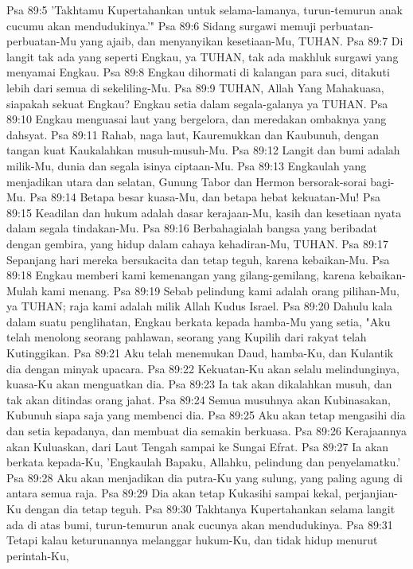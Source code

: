 Psa 89:5  'Takhtamu Kupertahankan untuk selama-lamanya, turun-temurun anak cucumu akan mendudukinya.'"
Psa 89:6  Sidang surgawi memuji perbuatan-perbuatan-Mu yang ajaib, dan menyanyikan kesetiaan-Mu, TUHAN.
Psa 89:7  Di langit tak ada yang seperti Engkau, ya TUHAN, tak ada makhluk surgawi yang menyamai Engkau.
Psa 89:8  Engkau dihormati di kalangan para suci, ditakuti lebih dari semua di sekeliling-Mu.
Psa 89:9  TUHAN, Allah Yang Mahakuasa, siapakah sekuat Engkau? Engkau setia dalam segala-galanya ya TUHAN.
Psa 89:10  Engkau menguasai laut yang bergelora, dan meredakan ombaknya yang dahsyat.
Psa 89:11  Rahab, naga laut, Kauremukkan dan Kaubunuh, dengan tangan kuat Kaukalahkan musuh-musuh-Mu.
Psa 89:12  Langit dan bumi adalah milik-Mu, dunia dan segala isinya ciptaan-Mu.
Psa 89:13  Engkaulah yang menjadikan utara dan selatan, Gunung Tabor dan Hermon bersorak-sorai bagi-Mu.
Psa 89:14  Betapa besar kuasa-Mu, dan betapa hebat kekuatan-Mu!
Psa 89:15  Keadilan dan hukum adalah dasar kerajaan-Mu, kasih dan kesetiaan nyata dalam segala tindakan-Mu.
Psa 89:16  Berbahagialah bangsa yang beribadat dengan gembira, yang hidup dalam cahaya kehadiran-Mu, TUHAN.
Psa 89:17  Sepanjang hari mereka bersukacita dan tetap teguh, karena kebaikan-Mu.
Psa 89:18  Engkau memberi kami kemenangan yang gilang-gemilang, karena kebaikan-Mulah kami menang.
Psa 89:19  Sebab pelindung kami adalah orang pilihan-Mu, ya TUHAN; raja kami adalah milik Allah Kudus Israel.
Psa 89:20  Dahulu kala dalam suatu penglihatan, Engkau berkata kepada hamba-Mu yang setia, "Aku telah menolong seorang pahlawan, seorang yang Kupilih dari rakyat telah Kutinggikan.
Psa 89:21  Aku telah menemukan Daud, hamba-Ku, dan Kulantik dia dengan minyak upacara.
Psa 89:22  Kekuatan-Ku akan selalu melindunginya, kuasa-Ku akan menguatkan dia.
Psa 89:23  Ia tak akan dikalahkan musuh, dan tak akan ditindas orang jahat.
Psa 89:24  Semua musuhnya akan Kubinasakan, Kubunuh siapa saja yang membenci dia.
Psa 89:25  Aku akan tetap mengasihi dia dan setia kepadanya, dan membuat dia semakin berkuasa.
Psa 89:26  Kerajaannya akan Kuluaskan, dari Laut Tengah sampai ke Sungai Efrat.
Psa 89:27  Ia akan berkata kepada-Ku, 'Engkaulah Bapaku, Allahku, pelindung dan penyelamatku.'
Psa 89:28  Aku akan menjadikan dia putra-Ku yang sulung, yang paling agung di antara semua raja.
Psa 89:29  Dia akan tetap Kukasihi sampai kekal, perjanjian-Ku dengan dia tetap teguh.
Psa 89:30  Takhtanya Kupertahankan selama langit ada di atas bumi, turun-temurun anak cucunya akan mendudukinya.
Psa 89:31  Tetapi kalau keturunannya melanggar hukum-Ku, dan tidak hidup menurut perintah-Ku,
